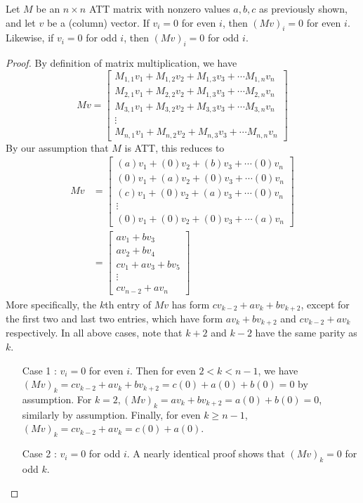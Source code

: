 \documentclass[10pt,twocolumn]{article}
\begin{document}
\begin{thm}\label{parity-preserving}
    Let $M$ be an $n\times n$ ATT matrix with nonzero values $a,b,c$ as previously shown, and let $v$ be a (column) vector. If $v_i=0$ for even $i$, then $(Mv)_i=0$ for even $i$. Likewise, if $v_i=0$ for odd $i$, then $(Mv)_i=0$ for odd $i$.
\end{thm}
\begin{proof}
    By definition of matrix multiplication, we have 
    $$Mv=\begin{bmatrix}
        M_{1,1}v_1 + M_{1,2}v_2 + M_{1,3}v_3 + \cdots M_{1,n}v_n \\
        M_{2,1}v_1 + M_{2,2}v_2 + M_{1,3}v_3 + \cdots M_{2,n}v_n \\
        M_{3,1}v_1 + M_{3,2}v_2 + M_{3,3}v_3 + \cdots M_{3,n}v_n \\
        \vdots \\
        M_{n,1}v_1 + M_{n,2}v_2 + M_{n,3}v_3 + \cdots M_{n,n}v_n
    \end{bmatrix}$$
    By our assumption that $M$ is ATT, this reduces to
    \begin{align*}
        Mv&=\begin{bmatrix}
        (a)v_1 + (0)v_2 + (b)v_3 + \cdots (0)v_n \\
        (0)v_1 + (a)v_2 + (0)v_3 + \cdots (0)v_n \\
        (c)v_1 + (0)v_2 + (a)v_3 + \cdots (0)v_n \\
        \vdots \\
        (0)v_1 + (0)v_2 + (0)v_3 + \cdots (a)v_n
    \end{bmatrix}\\
    &=\begin{bmatrix}
        av_1 + bv_3 \\
        av_2 + bv_4 \\
        cv_1 + av_3 + bv_5 \\
        \vdots \\
        cv_{n-2} + av_n
    \end{bmatrix}
    \end{align*}
    More specifically, the $k$th entry of $Mv$ has form $cv_{k-2}+av_k+bv_{k+2}$, except for the first two and last two entries, which have form $av_k+bv_{k+2}$ and $cv_{k-2} + av_{k}$ respectively. In all above cases, note that $k+2$ and $k-2$ have the same parity as $k$.
    \begin{enumerate}
        \item[Case 1]: $v_i=0$ for even $i$. Then for even $2<k<n-1$, we have $(Mv)_k=cv_{k-2}+av_k+bv_{k+2}=c(0)+a(0)+b(0) = 0$ by assumption. For $k=2, (Mv)_k=av_k+bv_{k+2}=a(0)+b(0)=0$, similarly by assumption. Finally, for even $k\geq n-1$, $(Mv)_k=cv_{k-2} + av_{k}=c(0)+a(0)$.
        \item[Case 2]: $v_i=0$ for odd $i$. A nearly identical proof shows that $(Mv)_k=0$ for odd $k$.
    \end{enumerate}
\end{proof}
\end{document}

